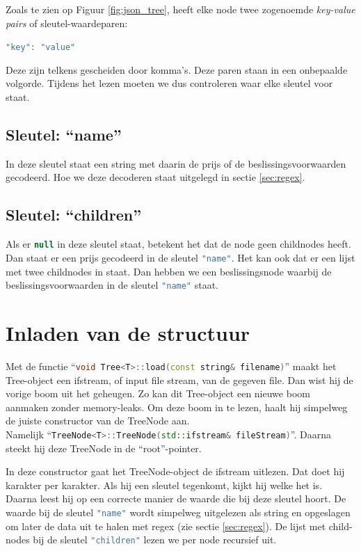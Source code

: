 Zoals te zien op Figuur \ref{fig:json_tree}, heeft elke node twee zogenoemde \textit{key-value pairs} of sleutel-waardeparen:

\nopagebreak
\lstinline[language=JavaScript]{"key": "value"}
\nopagebreak

Deze zijn telkens gescheiden door komma's. Deze paren staan in een onbepaalde volgorde. Tijdens het lezen moeten we dus controleren waar elke sleutel voor staat.

\subsection{Sleutel: ``name''}
In deze sleutel staat een string met daarin de prijs of de beslissingsvoorwaarden gecodeerd. Hoe we deze decoderen staat uitgelegd in sectie \ref{sec:regex}.
\subsection{Sleutel: ``children''}
Als er \lstinline[language=JavaScript]{null} in deze sleutel staat, betekent het dat de node geen childnodes heeft. Dan staat er een prijs gecodeerd in de sleutel \lstinline[language=JavaScript]{"name"}.
Het kan ook dat er een lijst met twee childnodes in staat. Dan hebben we een beslissingsnode waarbij de beslissingsvoorwaarden in de sleutel \lstinline[language=JavaScript]{"name"} staat.

\section{Inladen van de structuur}
Met de functie ``\lstinline[language=C++]{void Tree<T>::load(const string& filename)}'' maakt het Tree-object een ifstream, of input file stream, van de gegeven file. Dan wist hij de vorige boom uit het geheugen. Zo kan dit Tree-object een nieuwe boom aanmaken zonder memory-leaks. Om deze boom in te lezen, haalt hij simpelweg de juiste constructor van de TreeNode aan. \\
Namelijk  ``\lstinline[language=C++]{TreeNode<T>::TreeNode(std::ifstream& fileStream)}''. Daarna steekt hij deze TreeNode in de ``root''-pointer.

In deze constructor gaat het TreeNode-object de ifstream uitlezen. Dat doet hij karakter per karakter. Als hij een sleutel tegenkomt, kijkt hij welke het is. Daarna leest hij op een correcte manier de waarde die bij deze sleutel hoort. De waarde bij de sleutel \lstinline[language=JavaScript]{"name"} wordt simpelweg uitgelezen als string en opgeslagen om later de data uit te halen met regex (zie sectie \ref{sec:regex}). De lijst met child-nodes bij de sleutel \lstinline[language=JavaScript]{"children"} lezen we per node recursief uit.

